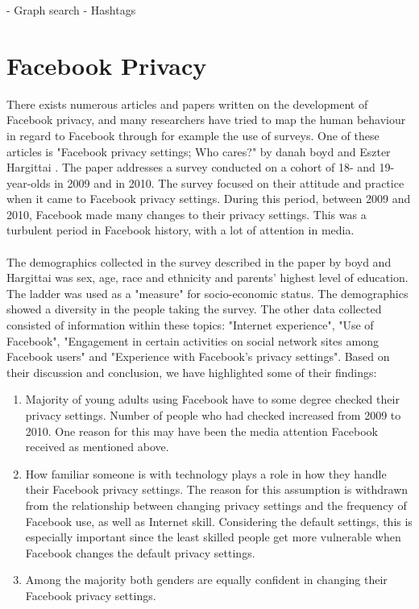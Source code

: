 - Graph search
- Hashtags

\section{Facebook Privacy}
There exists numerous articles and papers written on the development of Facebook privacy, and many researchers have tried to map the human behaviour in regard to Facebook through for example the use of surveys. One of these articles is "Facebook privacy settings; Who cares?" by danah boyd and Eszter Hargittai \cite{whocares}. The paper addresses a survey conducted on a cohort of 18- and 19-year-olds in 2009 and in 2010. The survey focused on their attitude and practice when it came to Facebook privacy settings. During this period, between 2009 and 2010, Facebook made many changes to their privacy settings. This was a turbulent period in Facebook history, with a lot of attention in media.

\paragraph{}
The demographics collected in the survey described in the paper by boyd and Hargittai was sex, age, race and ethnicity and parents' highest level of education. The ladder was used as a "measure" for socio-economic status. The demographics showed a diversity in the people taking the survey. The other data collected consisted of information within these topics: "Internet experience", "Use of Facebook", "Engagement in certain activities on social network sites among Facebook users" and "Experience with Facebook's privacy settings". Based on their discussion and conclusion, we have highlighted some of their findings: 

\begin{enumerate}
\item Majority of young adults using Facebook have to some degree checked their privacy settings. Number of people who had checked increased from 2009 to 2010. One reason for this may have been the media attention Facebook received as mentioned above. 
\item How familiar someone is with technology plays a role in how they handle their Facebook privacy settings. The reason for this assumption is withdrawn from the relationship between changing privacy settings and the frequency of Facebook use, as well as Internet skill. Considering the default settings, this is especially important since the least skilled people get more vulnerable when Facebook changes the default privacy settings. 
\item Among the majority both genders are equally confident in changing their Facebook privacy settings. 
\end{enumerate}

